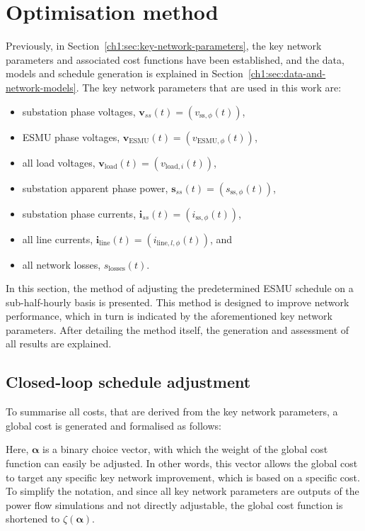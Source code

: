 \section{Optimisation method}
\label{ch1:sec:closed-loop-optimisation-method}

Previously, in Section~\ref{ch1:sec:key-network-parameters}, the key network parameters and associated cost functions have been established, and the data, models and schedule generation is explained in Section~\ref{ch1:sec:data-and-network-models}.
The key network parameters that are used in this work are:

\begin{itemize}
	\item substation phase voltages, $\textbf{v}_{ss}(t) = (v_{\text{ss},\phi}(t))$,
	\item ESMU phase voltages, $\textbf{v}_\text{ESMU}(t) = (v_{\text{ESMU},\phi}(t))$,
	\item all load voltages, $\textbf{v}_\text{load}(t) = (v_{\text{load},i}(t))$,
	\item substation apparent phase power, $\textbf{s}_{ss}(t) = (s_{\text{ss},\phi}(t))$,
	\item substation phase currents, $\textbf{i}_{ss}(t) = (i_{\text{ss},\phi}(t))$,
	\item all line currents, $\textbf{i}_\text{line}(t) = (i_{\text{line},l,\phi}(t))$, and
	\item all network losses, $s_\text{losses}(t)$.
\end{itemize}

In this section, the method of adjusting the predetermined ESMU schedule on a sub-half-hourly basis is presented.
This method is designed to improve network performance, which in turn is indicated by the aforementioned key network parameters.
After detailing the method itself, the generation and assessment of all results are explained. 

\subsection{Closed-loop schedule adjustment}

To summarise all costs, that are derived from the key network parameters, a global cost is generated and formalised as follows:



Here, $\boldsymbol{\alpha}$ is a binary choice vector, with which the weight of the global cost function can easily be adjusted.
In other words, this vector allows the global cost to target any specific key network improvement, which is based on a specific cost.
To simplify the notation, and since all key network parameters are outputs of the power flow simulations and not directly adjustable, the global cost function is shortened to $\zeta(\boldsymbol{\alpha})$.

